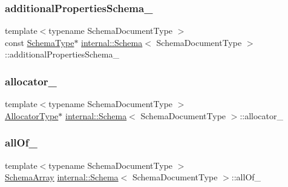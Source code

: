 \mbox{\label{classinternal_1_1Schema_a8129106a08ec66709237f4ee42c55690}} 
\subsubsection{\texorpdfstring{additional\+Properties\+Schema\+\_\+}{additionalPropertiesSchema\_}}
{\footnotesize\ttfamily template$<$typename Schema\+Document\+Type $>$ \\
const \hyperlink{classinternal_1_1Schema_ac2556ebf7a7db971e1c1c0f76eb5786e}{Schema\+Type}$\ast$ \hyperlink{classinternal_1_1Schema}{internal\+::\+Schema}$<$ Schema\+Document\+Type $>$\+::additional\+Properties\+Schema\+\_\+\hspace{0.3cm}{\ttfamily [private]}}

\mbox{\label{classinternal_1_1Schema_a28852d2f2ba03b1a11b5f5ed2f4a9c61}} 
\subsubsection{\texorpdfstring{allocator\+\_\+}{allocator\_}}
{\footnotesize\ttfamily template$<$typename Schema\+Document\+Type $>$ \\
\hyperlink{classinternal_1_1Schema_a7af392edd81e610754cd2e6b4f82761c}{Allocator\+Type}$\ast$ \hyperlink{classinternal_1_1Schema}{internal\+::\+Schema}$<$ Schema\+Document\+Type $>$\+::allocator\+\_\+\hspace{0.3cm}{\ttfamily [private]}}

\mbox{\label{classinternal_1_1Schema_aa0f884654352daad6a8fffb428baa441}} 
\subsubsection{\texorpdfstring{all\+Of\+\_\+}{allOf\_}}
{\footnotesize\ttfamily template$<$typename Schema\+Document\+Type $>$ \\
\hyperlink{structinternal_1_1Schema_1_1SchemaArray}{Schema\+Array} \hyperlink{classinternal_1_1Schema}{internal\+::\+Schema}$<$ Schema\+Document\+Type $>$\+::all\+Of\+\_\+\hspace{0.3cm}{\ttfamily [private]}}

